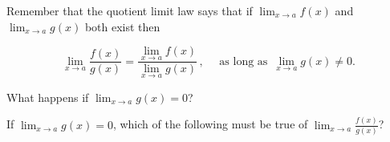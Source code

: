 \documentclass{ximera}
\author{Bobby Ramsey}
\begin{document}
Remember that the quotient limit law says that if $\displaystyle \lim_{x\to a} f(x)$ and $\displaystyle \lim_{x\to a} g(x)$ both exist then
	
\[ \lim_{x\to a} \frac{f(x)}{g(x)} = \frac{\lim_{x\to a} f(x)}{\lim_{x\to a}g(x)} \, , \quad \text{ as long as } \, \lim_{x\to a} g(x) \neq 0. \]
	
What happens if $\displaystyle \lim_{x\to a} g(x) = 0$?\\

\begin{exercise}	
	If $\displaystyle \lim_{x\to a} g(x) = 0$, which of the following must be true of $\displaystyle \lim_{x\to a} \frac{f(x)}{g(x)}$?
		\begin{multipleChoice}
		\end{multipleChoice}
	
\end{exercise}
\end{document}

